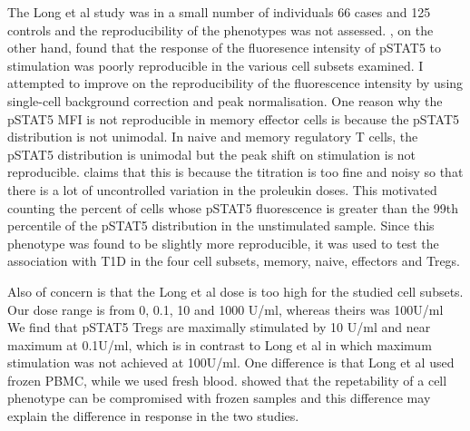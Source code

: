 The Long et al study was in a small number of individuals 66 cases and 125 controls and the reproducibility of the phenotypes was not assessed.
, on the other hand, found that the response of the fluoresence intensity of pSTAT5 to stimulation was poorly reproducible in the various cell subsets
examined.  I attempted to improve on the reproducibility of the fluorescence intensity by using single-cell background correction and peak normalisation.
One reason why the pSTAT5 MFI is not reproducible in memory effector cells is because the pSTAT5 distribution is not unimodal.
In naive and memory regulatory T cells, the pSTAT5 distribution is unimodal but the peak shift on stimulation is not reproducible.
 claims that this is because the titration is too fine and noisy so that there is a lot of uncontrolled variation in the proleukin doses.
This motivated counting the percent of cells whose pSTAT5 fluorescence is greater than the 99th percentile of the pSTAT5 distribution in the unstimulated sample.
Since this phenotype was found to be slightly more reproducible, it was used to test the association with T1D in the four cell subsets, memory, naive, effectors and Tregs.




Also of concern is that the Long et al dose is too high for the studied cell subsets.
Our dose range is from 0, 0.1, 10 and 1000 U/ml, whereas theirs was 100U/ml 
We find that pSTAT5 Tregs are maximally stimulated by 10 U/ml and near maximum at 0.1U/ml,
which is in contrast to Long et al in which maximum stimulation was not achieved at 100U/ml.
One difference is that Long et al used frozen \gls{PBMC}, while we used fresh blood.
\cite{Dendrou:2009dv} showed that the repetability of a cell phenotype can be compromised with frozen samples
and this difference may explain the difference in response in the two studies.






